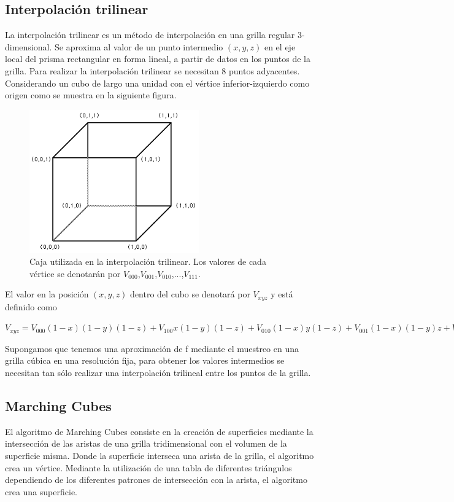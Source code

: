 \documentclass[12pt]{article}
\begin{document}
\subsection{Interpolación trilinear}
La interpolación trilinear\cite{inter} es un método de interpolación en una grilla regular 3-dimensional. Se aproxima al valor de un punto intermedio $(x, y, z)$ en el eje local del prisma rectangular en forma lineal, a partir de datos en los puntos de la grilla. Para realizar la interpolación trilinear se necesitan 8 puntos adyacentes.
Considerando un cubo de largo una unidad con el vértice inferior-izquierdo como origen como se muestra en la siguiente figura.
\begin{figure}[h!]
\includegraphics[width=0.65\textwidth,center]{inter.png}
\caption{Caja utilizada en la interpolación trilinear. Los valores de cada vértice se denotarán por $V_{000}$,$V_{001}$,$V_{010}$,...,$V_{111}$.}
\end{figure}

El valor en la posición $(x,y,z)$ dentro del cubo se denotará por $V_{xyz}$ y está definido como
\begin{center}
$V_{xyz}=V_{000}(1-x)(1-y)(1-z) + V_{100}x(1-y)(1-z) + V_{010}(1-x)y(1-z) + V_{001}(1-x)(1-y)z + V_{101}x(1-y)z + V_{011}(1-x)yz + V_{110}xy(1-z) + V_{111}xyz$
\end{center}

Supongamos que tenemos una aproximación de f mediante el muestreo en una grilla cúbica en una resolución fija, para obtener los valores intermedios se necesitan tan sólo realizar una interpolación trilineal entre los puntos de la grilla.


\subsection{Marching Cubes}
El algoritmo de Marching Cubes\cite{marching}\cite{marchingcubes} consiste en la creación de superficies mediante la intersección de las aristas de una grilla tridimensional con el volumen de la superficie misma. Donde la superficie interseca una arista de la grilla, el algoritmo crea un vértice. Mediante la utilización de una tabla de diferentes triángulos dependiendo de los diferentes patrones de intersección con la arista, el algoritmo crea una superficie.
\end{document}
